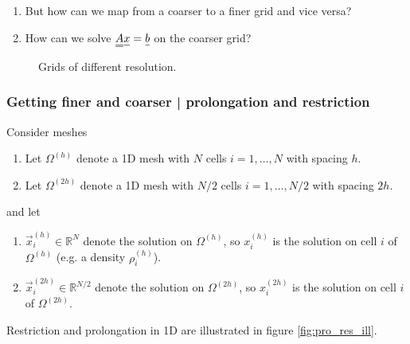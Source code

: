 
\begin{enumerate}
    \item But how can we map from a coarser to a finer grid and vice versa?
    \item How can we solve $\mat{A}\vec{x} = \vec{b}$ on the coarser grid?
\end{enumerate}


\begin{figure}
    \centering
    
    \caption{Grids of different resolution.}
    \label{fig:pro_res_grids}
\end{figure}

\subsubsection{Getting finer and coarser | prolongation and restriction}


Consider meshes
\begin{enumerate}
    \item Let $\Omega^{(h)}$ denote a 1D mesh with $N$ cells $i=1,\dots,N$ with spacing $h$.
    \item Let $\Omega^{(2h)}$ denote a 1D mesh with $N/2$ cells $i=1,\dots,N/2$ with spacing $2h$.
\end{enumerate}
and let
\begin{enumerate}
    \item $\vec{x}^{(h)}_i \in \mathbb{R}^{N}$ denote the solution on $\Omega^{(h)}$, so $x^{(h)}_i$ is the solution on cell $i$ of $\Omega^{(h)}$ (e.g. a density $\rho^{(h)}_i$).
    \item $\vec{x}^{(2h)}_i \in \mathbb{R}^{N/2}$ denote the solution on $\Omega^{(2h)}$, so $x^{(2h)}_i$ is the solution on cell $i$ of $\Omega^{(2h)}$.
\end{enumerate}

Restriction and prolongation in 1D are illustrated in figure \ref{fig:pro_res_ill}.

